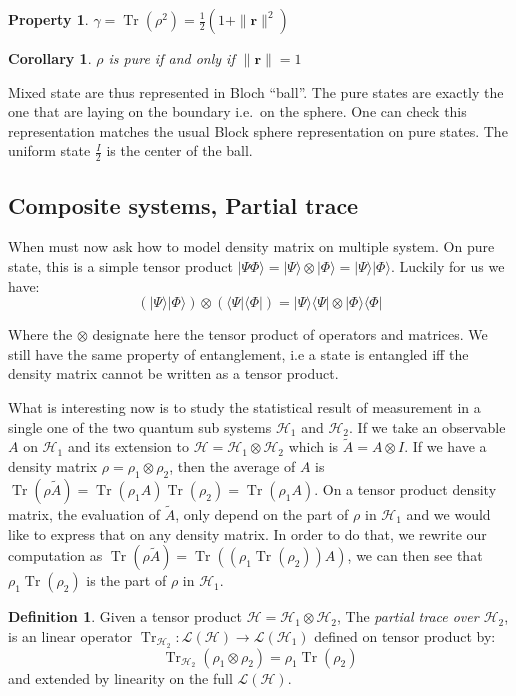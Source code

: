 \documentclass[10pt,a4paper]{report}
\theoremstyle{plain}
\newtheorem{prop}[thm]{Property}
\newtheorem{cor}{Corollary}[thm]
\theoremstyle{definition}
\newtheorem{defn}{Definition}[chapter]
\theoremstyle{remark}
\newcommand{\ket}[1]{|#1\rangle}
\newcommand{\bra}[1]{\langle#1|}
\newcommand{\bs}{\boldsymbol}
\DeclareMathOperator{\Tr}{Tr}
\begin{document}
\begin{prop}
  $\gamma = \Tr(\rho^2) = \frac 12 (1 + \|\bs r\|^2)$
\end{prop}

\begin{cor}
  $\rho$ is pure if and only if $\|\bs r\| = 1$
\end{cor}

Mixed state are thus represented in Bloch ``ball''. The pure states are exactly
the one that are laying on the boundary i.e.\ on the sphere. One can check this
representation matches the usual Block sphere representation on pure states. The
uniform state $\frac I2$ is the center of the ball.

\subsection{Composite systems, Partial trace}

When must now ask how to model density matrix on multiple system. On pure state,
this is a simple tensor product $\ket{\Psi\Phi} = \ket \Psi \otimes \ket \Phi =
\ket \Psi\ket\Phi$. Luckily for us we have:
\[(\ket\Psi\ket\Phi) \otimes (\bra\Psi\bra\Phi) = \ket\Psi\bra\Psi \otimes \ket
  \Phi \bra \Phi\]

Where the $\otimes$ designate here the tensor product of operators and matrices.
We still have the same property of entanglement, i.e a state is entangled iff
the density matrix cannot be written as a tensor product.

What is interesting now is to study the statistical result of measurement in a
single one of the two quantum sub systems $\mathcal{H}_1$ and $\mathcal{H}_2$.
If we take an observable $A$ on $\mathcal{H}_1$ and its extension to
$\mathcal{H} = \mathcal{H}_1 \otimes \mathcal{H}_2$ which is $\tilde A = A
\otimes I$. If we have a density matrix $\rho = \rho_1 \otimes \rho_2$, then the
average of $A$ is $\Tr(\rho \tilde A) = \Tr(\rho_1A)\Tr(\rho_2) = \Tr(\rho_1A)$.
On a tensor product density matrix, the evaluation of $\tilde A$, only depend on
the part of $\rho$ in $\mathcal{H}_1$ and we would like to express that on any
density matrix. In order to do that, we rewrite our computation as
$\Tr(\rho\tilde A) = \Tr((\rho_1\Tr(\rho_2))A)$, we can then see that
$\rho_1\Tr(\rho_2)$ is the part of $\rho$ in $\mathcal{H}_1$.

\begin{defn}
  Given a tensor product $\mathcal{H} = \mathcal{H}_1 \otimes \mathcal{H}_2$,
  The \emph{partial trace over $\mathcal{H}_2$}, is an linear operator
  $\Tr_{\mathcal{H}_2} : \mathcal{L}(\mathcal{H}) \to
  \mathcal{L}(\mathcal{H}_1)$ defined on tensor product by:
  \[\Tr_{\mathcal{H}_2}(\rho_1\otimes \rho_2) = \rho_1 \Tr(\rho_2)\]
  and extended by linearity on the full $\mathcal{L}(\mathcal{H})$.
\end{defn}
\end{document}
